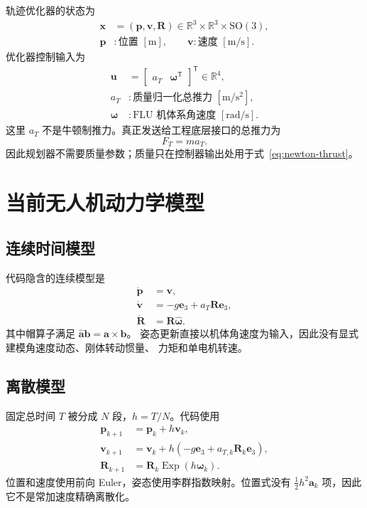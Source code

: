 \documentclass[UTF8,a4paper,11pt]{ctexart}
\newcommand{\R}{\mathbb R}
\newcommand{\SO}{\mathrm{SO}(3)}
\newcommand{\Exp}{\operatorname{Exp}}
\begin{document}
轨迹优化器的状态为
\begin{align}
 \bm x&=(\bm p,\bm v,\bm R)
 \in\R^3\times\R^3\times\SO,\\
 \bm p&:\text{位置 }[\mathrm m],\qquad
 \bm v:\text{速度 }[\mathrm{m/s}].
\end{align}
优化器控制输入为
\begin{align}
 \bm u&=\begin{bmatrix}a_T&\bm\omega^\mathsf T\end{bmatrix}^\mathsf T
 \in\R^4,\\
 a_T&:\text{质量归一化总推力 }[\mathrm{m/s^2}],\\
 \bm\omega&:\text{FLU 机体系角速度 }[\mathrm{rad/s}].
\end{align}
这里 $a_T$ 不是牛顿制推力。真正发送给工程底层接口的总推力为
\begin{equation}
 F_T=m a_T.
 \label{eq:newton-thrust}
\end{equation}
因此规划器不需要质量参数；质量只在控制器输出处用于式~\eqref{eq:newton-thrust}。

\section{当前无人机动力学模型}

\subsection{连续时间模型}

代码隐含的连续模型是
\begin{align}
 \dot{\bm p}&=\bm v,\\
 \dot{\bm v}&=-g\bm e_3+a_T\bm R\bm e_3,\label{eq:continuous-v}\\
 \dot{\bm R}&=\bm R\widehat{\bm\omega}.
 \label{eq:continuous-R}
\end{align}
其中帽算子满足 $\widehat{\bm a}\bm b=\bm a\times\bm b$。
姿态更新直接以机体角速度为输入，因此没有显式建模角速度动态、刚体转动惯量、
力矩和单电机转速。

\subsection{离散模型}

固定总时间 $T$ 被分成 $N$ 段，$h=T/N$。代码使用
\begin{align}
 \bm p_{k+1}&=\bm p_k+h\bm v_k,\label{eq:disc-p}\\
 \bm v_{k+1}&=\bm v_k+h(-g\bm e_3+a_{T,k}\bm R_k\bm e_3),
 \label{eq:disc-v}\\
 \bm R_{k+1}&=\bm R_k\Exp(h\bm\omega_k).
 \label{eq:disc-R}
\end{align}
位置和速度使用前向 Euler，姿态使用李群指数映射。位置式没有
$\tfrac12h^2\bm a_k$ 项，因此它不是常加速度精确离散化。
\end{document}
